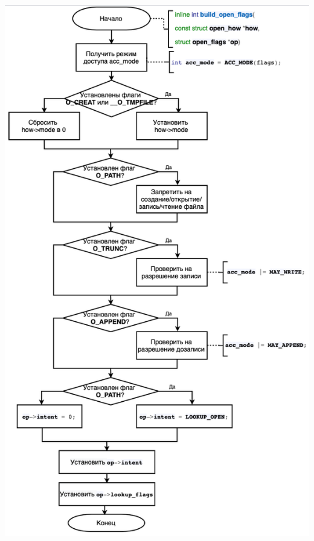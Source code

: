\documentclass[12pt]{report}
\begin{document}
\begin{center}
		\includegraphics[scale=0.95]{pics/part2.png}
\end{center}
\end{document}
